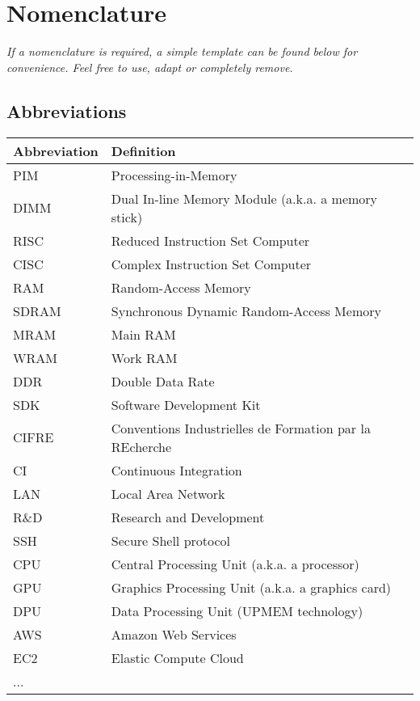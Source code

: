 \chapter*{Nomenclature}

\emph{If a nomenclature is required, a simple template can be found below for convenience. Feel free to use, adapt or completely remove.}

\section*{Abbreviations}

\begin{longtable}{p{2.5cm}p{8cm}}
    \toprule
    Abbreviation & Definition \\
    \midrule\endhead %
    PIM & Processing-in-Memory \\
    DIMM & Dual In-line Memory Module (a.k.a. a memory stick) \\
    RISC & Reduced Instruction Set Computer \\
    CISC & Complex Instruction Set Computer \\
    RAM & Random-Access Memory \\
    SDRAM & Synchronous Dynamic Random-Access Memory \\
    MRAM & Main RAM \\
    WRAM & Work RAM \\
    DDR & Double Data Rate \\
    SDK & Software Development Kit \\
    CIFRE & Conventions Industrielles de Formation par la REcherche \\
    CI & Continuous Integration \\
    LAN & Local Area Network \\
    R\&D & Research and Development \\
    SSH & Secure Shell protocol \\
    CPU & Central Processing Unit (a.k.a. a processor) \\
    GPU & Graphics Processing Unit (a.k.a. a graphics card) \\
    DPU & Data Processing Unit (UPMEM technology) \\
    AWS & Amazon Web Services \\
    EC2 & Elastic Compute Cloud \\
    ... \\
    \bottomrule
\end{longtable}

